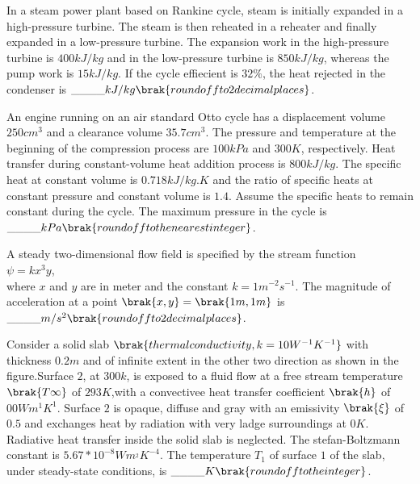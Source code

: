      \item In a steam power plant based on Rankine cycle, steam is initially expanded in a 
     high-pressure turbine. The steam is then reheated in a reheater and finally expanded in a low-pressure turbine. The expansion work in the high-pressure turbine is $400 kJ/kg$ and in the low-pressure turbine is $850 kJ/kg$, whereas the pump work is $15 kJ/kg$. If the cycle effiecient is $32\%$, the heat rejected in the condenser is $\_\_\_\_kJ/kg \brak{round off to 2 decimal places}$.\\
     \item An engine running on an air standard Otto cycle has a displacement volume $250 cm^{3}$
     and a clearance volume $35.7 cm^{3}$. The pressure and temperature at the beginning of the compression process are $100 kPa$ and $300 K$, respectively. Heat transfer during constant-volume heat addition process is $800 kJ/kg$. The specific heat at constant volume is $0.718 kJ/kg.K$ and the ratio of specific heats at constant pressure and constant volume is $1.4$. Assume the specific heats to remain constant during the cycle. The maximum pressure in the cycle is$\_\_\_\_ kPa \brak{round off to the nearest integer}$.\\
     \item A steady two-dimensional flow field is specified by the stream function\\
                      $\psi=kx^{3}y$,\\
     where $x$ and $y$ are in meter and the constant $k=1 m^{-2}s^{-1}$. The magnitude of acceleration at a point $\brak{x,y}=\brak{1 m,1 m}$ is $\_\_\_\_m/s^{2} \brak{round off to 2 decimal places}$.\\
     \item Consider a solid slab $\brak{thermal conductivity, k=10 W^{-1}K^{-1}}$ with thickness $0.2 m$ and of infinite extent in the other two direction as shown in the figure.Surface $2$, at $300 k$, is exposed to a fluid flow at a free stream temperature $\brak{T\infty}$ of $293 K$,with a convectivee heat transfer coefficient $\brak{h}$ of $00 Wm^{1}K^{1}$. Surface $2$ is opaque, diffuse and gray with an emissivity $\brak{\xi}$ of $0.5$ and exchanges heat by radiation with very ladge surroundings at $0 K$. Radiative heat transfer inside the solid slab is neglected. The stefan-Boltzmann constant is $5.67*10^{-8}Wm^{_2}K^{-4}$. The temperature $T_{1}$ of surface $1$ of the slab, under steady-state conditions, is $\_\_\_\_K \brak{round off to the integer}$.\\

